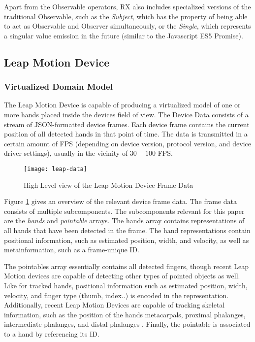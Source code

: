 Apart from the Observable operators, \gls{RX} also includes specialized versions of the traditional Observable, such as the \emph{Subject}, which has the property of being able to act as Observable and Observer simultaneously, or the \emph{Single}, which represents a singular value emission in the future (similar to the Javascript ES5 Promise).


\subsection{Leap Motion Device}
\subsubsection{Virtualized Domain Model}
The Leap Motion Device is capable of producing a virtualized model of one or more hands placed inside the devices field of view. The Device Data consists of a stream of JSON-formatted device frames. Each device frame contains the current position of all detected hands in that point of time. The data is transmitted in a certain amount of \gls{FPS} (depending on device version, protocol version, and device driver settings), usually in the vicinity of $30 - 100$ \gls{FPS}.

\begin{figure}[h]
    \centering
    \texttt{[image: leap-data]}
    \caption{High Level view of the Leap Motion Device Frame Data}
    \label{fig:leap-frame-data}
\end{figure}

Figure \ref{fig:leap-frame-data} gives an overview of the relevant device frame data. The frame data consists of multiple subcomponents. The subcomponents relevant for this paper are the \emph{hands} and \emph{pointable} arrays. The hands array contains representations of all hands that have been detected in the frame. The hand representations contain positional information, such as estimated position, width, and velocity, as well as metainformation, such as a frame-unique ID.

The pointables array essentially contains all detected fingers, though recent Leap Motion devices are capable of detecting other types of pointed objects as well. Like for tracked hands, positional information such as estimated position, width, velocity, and finger type (thumb, index..) is encoded in the representation. Additionally, recent Leap Motion Devices are capable of tracking skeletal information, such as the position of the hands metacarpals, proximal phalanges, intermediate phalanges, and distal phalanges \cite{LeapJsProtocol}. Finally, the pointable is associated to a hand by referencing its ID.


